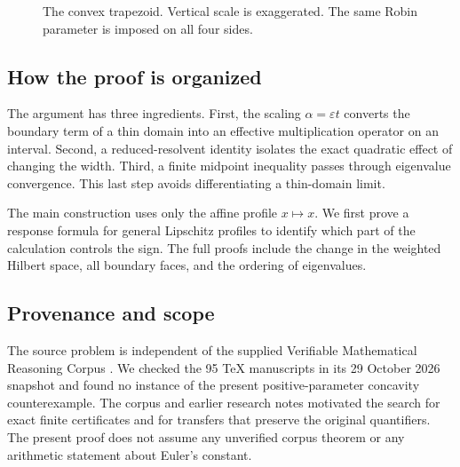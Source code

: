 \documentclass[11pt,a4paper]{article}
\theoremstyle{definition}\newtheorem{definition}[theorem]{Definition}
\theoremstyle{remark}\newtheorem{remark}[theorem]{Remark}
\begin{document}
\begin{figure}[ht]
\centering
{}
\caption{The convex trapezoid. Vertical scale is exaggerated.
The same Robin parameter is imposed on all four sides.}
\label{fig:trapezoid}
\end{figure}

\subsection{How the proof is organized}
The argument has three ingredients. First, the scaling
$\alpha=\varepsilon t$ converts the boundary term of a thin domain
into an effective multiplication operator on an interval.
Second, a reduced-resolvent identity isolates the exact quadratic
effect of changing the width. Third, a finite midpoint inequality
passes through eigenvalue convergence. This last step avoids
differentiating a thin-domain limit.

The main construction uses only the affine profile $x\mapsto x$.
We first prove a response formula for general Lipschitz profiles
to identify which part of the calculation controls the sign.
The full proofs include the change in the weighted Hilbert space,
all boundary faces, and the ordering of eigenvalues.

\subsection{Provenance and scope}
The source problem is independent of the supplied
Verifiable Mathematical Reasoning Corpus \cite{VMRC}. We checked
the 95 TeX manuscripts in its 29 October 2026 snapshot and found no
instance of the present positive-parameter concavity counterexample.
The corpus and earlier research notes motivated the search for
exact finite certificates and for transfers that preserve the
original quantifiers. The present proof does not assume any
unverified corpus theorem or any arithmetic statement about
Euler's constant.
\end{document}
